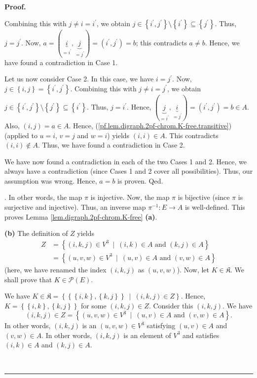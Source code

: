 \documentclass[numbers=enddot,12pt,final,onecolumn,notitlepage]{scrartcl}%
\theoremstyle{definition}
\newenvironment{proof}[1][Proof]{\noindent\textbf{#1.} }{\ \rule{0.5em}{0.5em}}
\newenvironment{verlong}{}{}
\begin{document}
\begin{verlong}
\begin{proof}
{Combining this with $j\neq i=i^{\prime}$, we obtain $j\in\left\{  i^{\prime
},j^{\prime}\right\}  \setminus\left\{  i^{\prime}\right\}  \subseteq\left\{
j^{\prime}\right\}  $. Thus, $j=j^{\prime}$. Now, $a=\left(  \underbrace{i}%
_{=i^{\prime}},\underbrace{j}_{=j^{\prime}}\right)  =\left(  i^{\prime
},j^{\prime}\right)  =b$; this contradicts $a\neq b$. Hence, we have found a
contradiction in Case 1.
\par
Let us now consider Case 2. In this case, we have $i=j^{\prime}$. Now,
$j\in\left\{  i,j\right\}  =\left\{  i^{\prime},j^{\prime}\right\}  $.
Combining this with $j\neq i=j^{\prime}$, we obtain $j\in\left\{  i^{\prime
},j^{\prime}\right\}  \setminus\left\{  j^{\prime}\right\}  \subseteq\left\{
i^{\prime}\right\}  $. Thus, $j=i^{\prime}$. Hence, $\left(  \underbrace{j}%
_{=i^{\prime}},\underbrace{i}_{=j^{\prime}}\right)  =\left(  i^{\prime
},j^{\prime}\right)  =b\in A$. Also, $\left(  i,j\right)  =a\in A$. Hence,
(\ref{pf.lem.digraph.2pf-chrom.K-free.transitive}) (applied to $u=i$, $v=j$
and $w=i$) yields $\left(  i,i\right)  \in A$. This contradicts $\left(
i,i\right)  \notin A$. Thus, we have found a contradiction in Case 2.
\par
We have now found a contradiction in each of the two Cases 1 and 2. Hence, we
always have a contradiction (since Cases 1 and 2 cover all possibilities).
Thus, our assumption was wrong. Hence, $a=b$ is proven. Qed.}. In other words,
the map $\pi$ is injective. Now, the map $\pi$ is bijective (since $\pi$ is
surjective and injective). Thus, an inverse map $\pi^{-1}:E\rightarrow A$ is
well-defined. This proves Lemma \ref{lem.digraph.2pf-chrom.K-free}
\textbf{(a)}.

\textbf{(b)} The definition of $Z$ yields%
\begin{align*}
Z  &  =\left\{  \left(  i,k,j\right)  \in V^{3}\ \mid\ \left(  i,k\right)  \in
A\text{ and }\left(  k,j\right)  \in A\right\} \\
&  =\left\{  \left(  u,v,w\right)  \in V^{3}\ \mid\ \left(  u,v\right)  \in
A\text{ and }\left(  v,w\right)  \in A\right\}
\end{align*}
(here, we have renamed the index $\left(  i,k,j\right)  $ as $\left(
u,v,w\right)  $). Now, let $K\in\mathfrak{K}$. We shall prove that
$K\in\mathcal{P}\left(  E\right)  $.

We have $K\in\mathfrak{K}=\left\{  \left\{  \left\{  i,k\right\}  ,\left\{
k,j\right\}  \right\}  \ \mid\ \left(  i,k,j\right)  \in Z\right\}  $. Hence,
$K=\left\{  \left\{  i,k\right\}  ,\left\{  k,j\right\}  \right\}  $ for some
$\left(  i,k,j\right)  \in Z$. Consider this $\left(  i,k,j\right)  $. We
have
\[
\left(  i,k,j\right)  \in Z=\left\{  \left(  u,v,w\right)  \in V^{3}%
\ \mid\ \left(  u,v\right)  \in A\text{ and }\left(  v,w\right)  \in
A\right\}  .
\]
In other words, $\left(  i,k,j\right)  $ is an $\left(  u,v,w\right)  \in
V^{3}$ satisfying $\left(  u,v\right)  \in A$ and $\left(  v,w\right)  \in A$.
In other words, $\left(  i,k,j\right)  $ is an element of $V^{3}$ and
satisfies $\left(  i,k\right)  \in A$ and $\left(  k,j\right)  \in A$.


\end{proof}
\end{verlong}
\end{document}

